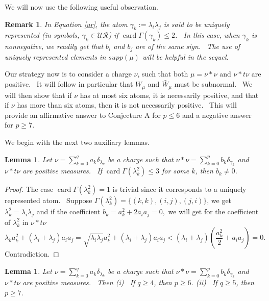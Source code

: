 \documentclass[12pt]{amsart}
\newtheorem{lem}[thm]{Lemma}
\newtheorem{rem}[thm]{Remark}
\newcommand{\card}{\operatorname{card}}
\begin{document}
We will now use the following useful observation.
\begin{rem} In Equation \ref{ur}, the atom  $\gamma_k:=\lambda_i\lambda_j$ is said to be uniquely represented (in symbols, $\gamma_k \in \mathcal{UR}$) if $\card\Gamma(\gamma_k)\le 2$. \ In this case, when $\gamma_k$ is nonnegative, we readily get that $b_i$ and $b_j$ are of the same sign. \ The use of uniquely represented elements in $supp(\mu)$ will be helpful in the sequel.
\end{rem} 
Our strategy now is to consider a charge $\nu$, such that both $\mu=\nu*\nu$ and $\nu*t\nu$ are positive. \ It will follow in particular that $W_\mu$  and $\widetilde{ W_\mu}$ must be subnormal. \ We will then show that if $\nu$ has at most six atoms, it is necessarily positive, and that if $\nu$ has more than six atoms, then it is not necessarily positive. \ This will provide an affirmative answer to Conjecture A for $p\le 6$ and a negative answer for $p\ge 7$.

We begin with the next two auxiliary lemmas.
\begin{lem}\label{card3}
    Let $\nu=\sum_{k=0}^q a_k\delta_{\lambda_k}$ be a charge such that $\nu*\nu=\sum_{k=0}^p b_k \delta_{\gamma_k}$ and $\nu*t\nu$ are positive measures. \ If  $\card\Gamma(\lambda^2_k)\leq 3$ for some  $k$, then  $b_k\ne0$.
\end{lem}
\begin{proof}
 The case $\card\Gamma(\lambda^2_k)=1$ is trivial since it corresponds to a uniquely represented atom. \  Suppose  $\Gamma(\lambda^2_k)=\{(k,k),(i,j),(j,i) \}$, we get $ \lambda_k^2=\lambda_i \lambda_j$ and if the coefficient $b_k=a_k^2+2a_ia_j=0,$  we will get for the coefficient of  $\lambda^2_k$ in $\nu*t\nu$
 $$
 \lambda_ka_k^2+(\lambda_i+\lambda_j)a_ia_j=\sqrt{\lambda_i\lambda_j}a_k^2+(\lambda_i+\lambda_j)a_ia_j<(\lambda_i+\lambda_j)\left(\frac{a_k^2}{2}+a_ia_j\right)=0.$$
 Contradiction.
\end{proof}
\begin{lem}\label{p4-5}
    Let $\nu=\sum_{k=0}^q a_k\delta_{\lambda_k}$ be a charge such that $\nu*\nu=\sum_{k=0}^p b_k \delta_{\gamma_k}$ and $\nu*t\nu$ are positive measures. \ Then \newline
    (i) \ If $q \ge 4$, then  $p\ge 6$. \newline
    (ii) \ If $q \ge 5$, then  $p\ge 7$.
\end{lem}
\end{document}
